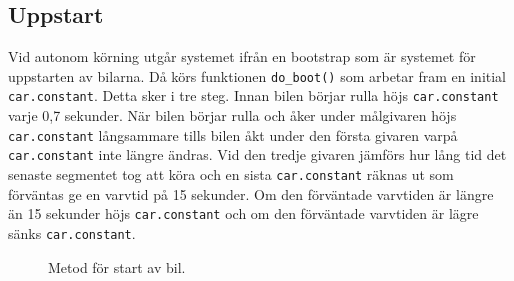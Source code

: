 \subsection{Uppstart} 
\label{sec:systembeskrivning:uppstart}
Vid autonom körning utgår systemet ifrån en bootstrap som är systemet för uppstarten av bilarna. Då körs funktionen \texttt{do\_boot()} som arbetar fram en
initial \texttt{car.constant}. Detta sker i tre steg. Innan bilen börjar rulla
höjs \texttt{car.constant} varje 0,7 sekunder. När bilen börjar rulla och åker
under målgivaren höjs \texttt{car.constant} långsammare tills bilen åkt under
den första givaren varpå \texttt{car.constant} inte längre ändras. Vid den
tredje givaren jämförs hur lång tid det senaste segmentet tog att köra och en
sista \texttt{car.constant} räknas ut som förväntas ge en varvtid på 15
sekunder. Om den förväntade varvtiden är längre än 15 sekunder höjs
\texttt{car.constant} och om den förväntade varvtiden är lägre sänks
\texttt{car.constant}.

\begin{figure}
	\centering
	\caption{Metod för start av bil.}
	\label{fig:bootstrap}
\end{figure}
